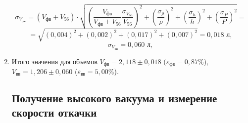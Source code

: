 \documentclass[a4paper]{article}
\begin{document}
\begin{enumerate}
\begin{equation*}
\end{equation*}
\begin{equation*}
\sigma_{V_\text{фв}} = (V_\text{фв} + V_{56}) \cdot \sqrt{\left( \frac{V_\text{фв}}{V_\text{фв} + V_{56}} \frac{\sigma_{V_{56}}}{V_{56}} \right)^2 + \left(\frac{\sigma_\rho}{\rho}\right)^2 + \left(\frac{\sigma_h}{h}\right)^2 + \left(\frac{\sigma_P}{P}\right)^2} =
\end{equation*}
\begin{equation*}
= \sqrt{\left( 0,004 \right)^2 + \left(0,002\right)^2 + \left(0,017\right)^2 + \left(0,007\right)^2} = 0,018 \text{ л},
\end{equation*}
\begin{equation*}
\sigma_{V_\text{вв}}  = 0,060 \text{ л},
\end{equation*}

\item Итого значения для объемов $V_\text{фв} = 2,118 \pm 0,018$ ($\varepsilon_\text{фв} =0,87 \%$), $V_\text{вв} = 1,206 \pm 0,060$ ($\varepsilon_\text{вв} =5,00 \%$).

\subsection{Получение высокого вакуума и измерение скорости откачки}


\end{enumerate}
\end{document}
